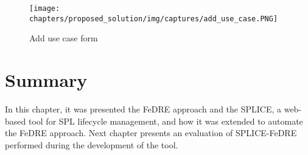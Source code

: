 \begin{figure}[htp]
\begin{center}
  \texttt{[image: chapters/proposed\_solution/img/captures/add\_use\_case.PNG]}
  \caption[Add use case form]{Add use case form}
  \label{fg:add-use-case}
\end{center}
\end{figure}

\section{Summary}
\label{sc:solutionsummary}

In this chapter, it was presented the \acf{FeDRE} approach and the \acf{SPLICE},
a web-based tool for \ac{SPL} lifecycle management, and how it was extended to 
automate the \ac{FeDRE} approach. Next chapter presents an evaluation of SPLICE-FeDRE 
performed during the development of the tool. 


